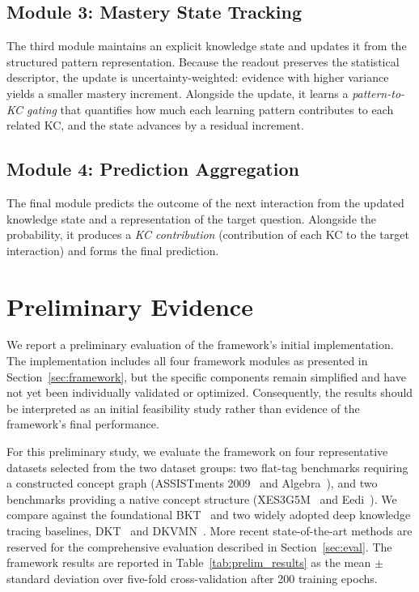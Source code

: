 \documentclass[conference]{IEEEtran}
\begin{document}
\subsection{Module 3: Mastery State Tracking}
\label{sec:mst}

The third module maintains an explicit knowledge state and updates it from the structured pattern representation. Because the readout preserves the statistical descriptor, the update is uncertainty-weighted: evidence with higher variance yields a smaller mastery increment. Alongside the update, it learns a \emph{pattern-to-KC gating} that quantifies how much each learning pattern contributes to each related KC, and the state advances by a residual increment.

\subsection{Module 4: Prediction Aggregation}
\label{sec:pred}

The final module predicts the outcome of the next interaction from the updated knowledge state and a representation of the target question. Alongside the probability, it produces a \emph{KC contribution} (contribution of each KC to the target interaction) and forms the final prediction.

\section{Preliminary Evidence}
\label{sec:prelim}

We report a preliminary evaluation of the framework's initial implementation. The implementation includes all four framework modules as presented in Section~\ref{sec:framework}, but the specific components remain simplified and have not yet been individually validated or optimized. Consequently, the results should be interpreted as an initial feasibility study rather than evidence of the framework's final performance.

For this preliminary study, we evaluate the framework on four representative datasets selected from the two dataset groups: two flat-tag benchmarks requiring a constructed concept graph (ASSISTments 2009~\cite{feng2009assistments} and Algebra~\cite{stamper2010kddcup}), and two benchmarks providing a native concept structure (XES3G5M~\cite{liu2023xes3g5m} and Eedi~\cite{wang2021neurips}). We compare against the foundational BKT~\cite{corbett1994kt} and two widely adopted deep knowledge tracing baselines, DKT~\cite{piech2015dkt} and DKVMN~\cite{zhang2017dkvmn}. More recent state-of-the-art methods are reserved for the comprehensive evaluation described in Section~\ref{sec:eval}. The framework results are reported in Table~\ref{tab:prelim_results} as the mean $\pm$ standard deviation over five-fold cross-validation after 200 training epochs.
\end{document}
